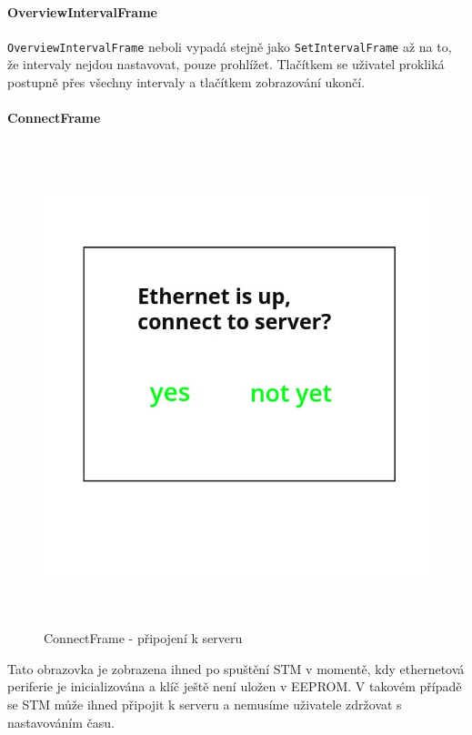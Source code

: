 \paragraph{OverviewIntervalFrame}
\texttt{OverviewIntervalFrame} neboli  vypadá stejně
jako \texttt{SetIntervalFrame} až na to, že intervaly nejdou nastavovat, pouze prohlížet.
Tlačítkem  se uživatel prokliká postupně přes všechny intervaly a tlačítkem  zobrazování
ukončí.

\paragraph{ConnectFrame}
\begin{figure}[H]\centering
\includegraphics[width=140mm, height=140mm]{../img/connect_frame.jpg}
\caption{ConnectFrame - připojení k serveru}
\label{connect-frame}
\end{figure}

Tato obrazovka je zobrazena ihned po spuštění STM v momentě, kdy ethernetová periferie je inicializována
a klíč ještě není uložen v EEPROM.
V takovém případě se STM může ihned připojit k serveru a nemusíme uživatele zdržovat s nastavováním
času.

